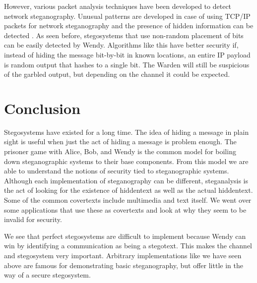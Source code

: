 \documentclass[11pt]{article}
\begin{document}
However, various packet analysis techniques have been developed to
detect network steganography. Unusual patterns are developed in case
of using TCP/IP packets for network steganography and the presence of
hidden information can be detected \cite{Das}. As seen before, stegosystems
that use non-random placement of bits can be easily detected by Wendy.
Algorithms like this have better security if, instead of hiding the
message bit-by-bit in known locations, an entire IP payload is random
output that hashes to a single bit. The Warden will still be
suspicious of the garbled output, but depending on the channel it
could be expected.

\section{Conclusion}
Stegosystems have existed for a long time. The idea of hiding a
message in plain sight is useful when just the act of hiding a message
is problem enough. The prisoner game with Alice, Bob, and Wendy is the
common model for boiling down steganographic systems to their base
components. From this model we are able to understand the notions of
security tied to steganographic systems. Although each implementation
of steganography can be different, steganalysis is the act of looking
for the existence of hiddentext as well as the actual hiddentext. Some
of the common covertexts include multimedia and text itself. We went
over some applications that use these as covertexts and look at why
they seem to be invalid for security.

We see that perfect stegosystems are difficult to implement because
Wendy can win by identifying a communication as being a stegotext.
This makes the channel and stegosystem very important. Arbitrary
implementations like we have seen above are famous for demonstrating
basic steganography, but offer little in the way of a secure
stegosystem.



\end{document}
